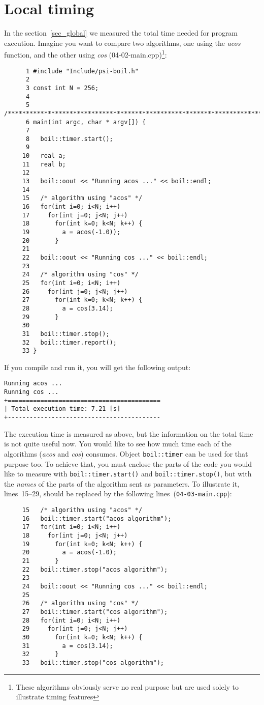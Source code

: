 \section{Local timing}
\label{sec_local}

In the section~\ref{sec_global} we measured the total time needed
for program execution. Imagine you want to compare two algorithms,
one using the {\em acos} function, and the other using {\em cos}
(04-02-main.cpp)\footnote{These algorithms obviously serve no real 
purpose but are used solely to illustrate timing features}:
%
{\small \begin{verbatim}
      1 #include "Include/psi-boil.h"
      2
      3 const int N = 256;
      4
      5 /****************************************************************************/
      6 main(int argc, char * argv[]) {
      7
      8   boil::timer.start();
      9
     10   real a;
     11   real b;
     12
     13   boil::oout << "Running acos ..." << boil::endl;
     14
     15   /* algorithm using "acos" */
     16   for(int i=0; i<N; i++)
     17     for(int j=0; j<N; j++)
     18       for(int k=0; k<N; k++) {
     19         a = acos(-1.0));
     20       }
     21
     22   boil::oout << "Running cos ..." << boil::endl;
     23
     24   /* algorithm using "cos" */
     25   for(int i=0; i<N; i++)
     26     for(int j=0; j<N; j++)
     27       for(int k=0; k<N; k++) {
     28         a = cos(3.14);
     29       }
     30
     31   boil::timer.stop();
     32   boil::timer.report();
     33 }
\end{verbatim}}
%
If you compile and run it, you will get the following output:
%
{\small \begin{verbatim}
Running acos ...
Running cos ...
+==========================================
| Total execution time: 7.21 [s]
+------------------------------------------
\end{verbatim}}
%
The execution time is measured as above, but the information on the 
total time is not quite useful now. You would like to see how much
time each of the algorithms ({\em acos} and {\em cos}) consumes.
Object {\tt boil::timer} can be used for that purpose too. To achieve
that, you must enclose the parts of the code you would like to 
measure with {\tt boil::timer.start()} and {\tt boil::timer.stop()},
but with the {\em names} of the parts of the algorithm sent as
parameters. To illustrate it, lines~15--29, should be replaced by the 
following lines~({\tt 04-03-main.cpp}):
%
{\small \begin{verbatim}
     15   /* algorithm using "acos" */
     16   boil::timer.start("acos algorithm");
     17   for(int i=0; i<N; i++)
     18     for(int j=0; j<N; j++)
     19       for(int k=0; k<N; k++) {
     20         a = acos(-1.0);
     21       }
     22   boil::timer.stop("acos algorithm");
     23
     24   boil::oout << "Running cos ..." << boil::endl;
     25
     26   /* algorithm using "cos" */
     27   boil::timer.start("cos algorithm");
     28   for(int i=0; i<N; i++)
     29     for(int j=0; j<N; j++)
     30       for(int k=0; k<N; k++) {
     31         a = cos(3.14);
     32       }
     33   boil::timer.stop("cos algorithm");
\end{verbatim}}
